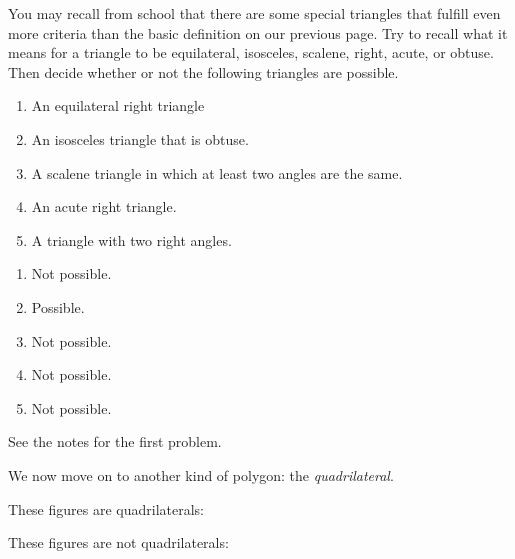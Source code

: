 \documentclass[nooutcomes,noauthor]{ximera}
\begin{document}
\begin{problem} You may recall from school that there are some special triangles that fulfill even more criteria than the basic definition on our previous page.  Try to recall what it means for a triangle to be equilateral, isosceles, scalene, right, acute, or obtuse.  Then decide whether or not the following triangles are possible.
\begin{enumerate}
\item An equilateral right triangle
\item An isosceles triangle that is obtuse.
\item A scalene triangle in which at least two angles are the same.
\item An acute right triangle.
\item A triangle with two right angles.
\end{enumerate}

\begin{solution}
\begin{enumerate}
\item Not possible.
\item Possible.
\item Not possible.
\item Not possible.
\item Not possible.
\end{enumerate}
\end{solution}

\begin{instructorNotes}
    See the notes for the first problem.
\end{instructorNotes}
\end{problem}

\pagebreak
 We now move on to another kind of polygon: the {\em quadrilateral}.

These figures are quadrilaterals:

\begin{image}
\end{image}

These figures are not quadrilaterals:
\begin{image}  \end{image}
\end{document}
